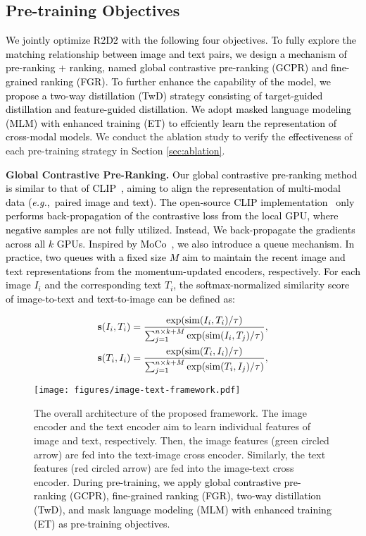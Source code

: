 \documentclass[sigconf]{acmart}
\def\eg{\mbox{\textit{e.g.}, }}
\def\bs{{\bf s}}
\def\exp{{\mathrm{exp}}}
\def\simm{{\mathrm{sim}}}
\def\mmxie{\textcolor{black}}
\def\mmljc{\textcolor{black}}
\def\mmcr{\textcolor{black}}
\begin{document}
\subsection{Pre-training Objectives}\label{sec Objectives}
\mmxie{We jointly optimize \mmcr{R2D2} with \mmljc{the following} four objectives.}
\mmcr{To fully explore the matching relationship between image and text pairs, we design a mechanism of pre-ranking + ranking, named global contrastive pre-ranking (GCPR) and fine-grained ranking (FGR). To further enhance the capability of the model, we propose a two-way distillation (TwD) strategy consisting of target-guided distillation and feature-guided distillation. We adopt masked language modeling (MLM) with enhanced training (ET) to effciently learn the representation of cross-modal models.}
We conduct the ablation study to verify the \mmljc{effectiveness} of each pre-training strategy in Section \ref{sec:ablation}.


\textbf{Global Contrastive Pre-Ranking.}
\mmxie{Our global contrastive pre-ranking method is similar to that of CLIP~\cite{CLIP}, aiming to align the representation of multi-modal data (\eg paired image and text). 
The open-source CLIP implementation~\cite{CLIP} only performs back-propagation of the contrastive loss from the local GPU, where negative samples are not fully utilized. Instead, We back-propagate the gradients across all $k$ GPUs. Inspired by MoCo~\cite{moco}, we also introduce a queue mechanism. In practice, two queues with a fixed size $M$ aim to maintain the recent image and text representations from the momentum-updated encoders, respectively.  
For each image $I_{i}$ and the corresponding text $T_{i}$, the softmax-normalized similarity score of image-to-text and text-to-image can be defined as:}

\begin{equation}
    \begin{aligned}
    \label{IT-score-multi-gpu}
    \bs(I_{i}, T_{i}) = \frac{\exp(\simm(I_{i}, T_{i})/\tau)}{\sum_{j=1}^{n\times k+M} \exp(\simm(I_{i}, T_{j})/\tau)}, \\
    \bs(T_{i}, I_{i}) = \frac{\exp(\simm(T_{i}, I_{i})/\tau)}{\sum_{j=1}^{n\times k+M} \exp(\simm(T_{i}, I_{j})/\tau)}, 
    \end{aligned}
\end{equation}

\begin{figure*}[t]
    \centering
	\texttt{[image: figures/image-text-framework.pdf]}
	\caption{The overall architecture of the proposed framework. The image encoder and the text encoder aim to learn individual features of image and text, respectively. Then, the image features (green circled arrow) are fed into the text-image cross encoder. Similarly, the text features (red circled arrow) are fed into the image-text cross encoder. 
\mmcr{During pre-training, we apply global contrastive pre-ranking (GCPR), fine-grained ranking (FGR), two-way distillation (TwD), and mask language modeling (MLM) with enhanced training (ET) as pre-training objectives.}
    }
	\label{fig:framework}
\end{figure*}
\end{document}
